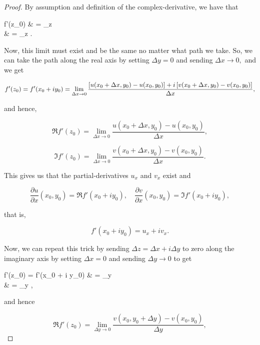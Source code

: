 \documentclass{article}
\begin{document}
\begin{proof}
By assumption and definition of the \@{complex-derivative}, we have that

\bal
f'(z_0) & = \lim_{\Delta z }  \\
        & = \lim_{\Delta z } .
\eal

Now, this limit must exist and be the same no matter what path we take. So, we can take the path along the real axis by setting $\Delta y = 0$ and sending $\Delta x \to 0,$ and we get

\[ f'(z_0) = f'(x_0 + i y_0) =  \lim_{\Delta x \to 0} \frac{\left[u(x_0 + \Delta x, y_0) - u(x_0, y_0)\right] +
                i \left[v(x_0 + \Delta x, y_0) - v(x_0, y_0)\right] }{\Delta x}, \]

and hence,

\[ \Re{f'(z_0)} = \lim_{\Delta x \to 0} \frac{u(x_0 + \Delta x, y_0) - u(x_0, y_0)}{\Delta x}, \]

\[ \Im{f'(z_0)} = \lim_{\Delta x \to 0} \frac{v(x_0 + \Delta x, y_0) - v(x_0, y_0)}{\Delta x}. \]
 
This gives us that the \@{partial-derivatives} $u_x$ and $v_x$ exist and

\[ \frac{\partial u}{\partial x}(x_0, y_0) = \Re f'(x_0 + i y_0), \quad \frac{\partial v}{\partial x}(x_0, y_0) = \Im f'(x_0 + i y_0), \]

that is,

\[ f'(x_0 + i y_0) = u_x + i v_x. \tag{a} \]

Now, we can repeat this trick by sending $\Delta z = \Delta x + i \Delta y$ to zero along the imaginary axis by setting $\Delta x = 0$ and sending $\Delta y \to 0$ to get

\bal
f'(z_0) = f'(x_0 + i y_0) & = \lim_{\Delta y }  \\
        & =  \lim_{\Delta y } ,
\eal

and hence

\[ \Re{f'(z_0)} = \lim_{\Delta y \to 0} \frac{v(x_0, y_0 + \Delta y) - v(x_0, y_0)}{\Delta y}, \]


\end{proof}
\end{document}

